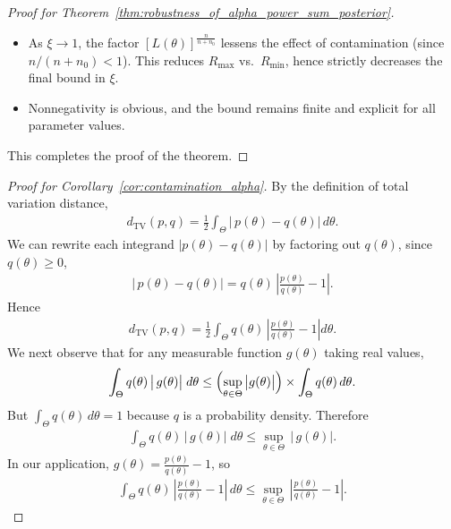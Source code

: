 \documentclass[12pt]{article}
\begin{document}
\begin{proof}[Proof for Theorem~\ref{thm:robustness_of_alpha_power_sum_posterior}]
\begin{itemize}
        \item As $\xi\to1$, the factor $[L(\theta)]^{\frac{n}{n+n_0}}$ lessens the effect of contamination (since $n/(n+n_0)<1$).  This reduces $R_{\max}$ vs.\ $R_{\min}$, hence strictly decreases the final bound in $\xi$.
        \item Nonnegativity is obvious, and the bound remains finite and explicit for all parameter values.  
    \end{itemize}
    This completes the proof of the theorem.
\end{proof}

\begin{proof}[Proof for Corollary~\ref{cor:contamination_alpha}]
    By the definition of total variation distance,
    \begin{align*}
        d_{\mathrm{TV}}(p,q) =  \frac{1}{2} \int_{\Theta} \bigl|\,p(\theta)-q(\theta)\bigr|\,d\theta.
    \end{align*}
    We can rewrite each integrand $|p(\theta)-q(\theta)|$ by factoring out $q(\theta)$, since $q(\theta) \geq 0$,
    \begin{align*}
        \left|\,p(\theta)-q(\theta)\right| =  q(\theta)\,\left| \frac{p(\theta)}{q(\theta)} - 1 \right|.
    \end{align*}
    Hence
    \begin{align*}
        d_{\mathrm{TV}}(p,q) = \frac{1}{2}\int_{\Theta} q(\theta)\,\left|\frac{p(\theta)}{q(\theta)} - 1 \right| d\theta.
    \end{align*}
    We next observe that for any measurable function $g(\theta)$ taking real values,
    \begin{align*}
        \int_{\Theta} q(\theta)\,\bigl|\,g(\theta)\bigr|\;d\theta \leq  \Bigl(\sup_{\theta\in\Theta}\,\bigl|g(\theta)\bigr|\Bigr) \times \int_{\Theta} q(\theta)\,d\theta.
    \end{align*}
    But $\int_{\Theta} q(\theta)\,d\theta=1$ because $q$ is a probability density.  Therefore
    \begin{align*}
        \int_{\Theta} q(\theta)\,\bigl|\,g(\theta)\bigr|\;d\theta \leq  \sup_{\theta\in\Theta}\,\bigl|\,g(\theta)\bigr|.
    \end{align*}
    In our application, $g(\theta)=\frac{p(\theta)}{q(\theta)} -1$, so
    \begin{align*}
        \int_{\Theta} q(\theta)\,\left|\frac{p(\theta)}{q(\theta)}-1\right| \,d\theta \leq  \sup_{\theta\in\Theta}\,\left|\frac{p(\theta)}{q(\theta)}-1\right|.
    \end{align*}

\end{proof}
\end{document}

